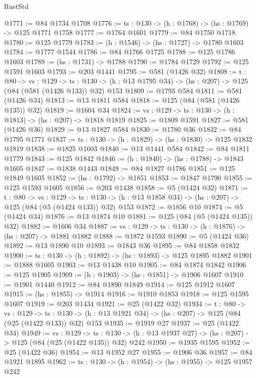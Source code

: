 \begin{lexlean}{RustStd}
\begin{coremodule}
{\begin{coremodule}
{{{{{{{{{{{{{{{@1771 := @84 @1734 @1708
@1776 := {ts : @130} -> (h : @1768) -> (hs : @1769) -> @125 @1771 @1758
@1777 := @1764 @1601
@1779 := @84 @1750 @1718
@1780 := @125 @1779
@1783 := (h : @1546) -> (hs : @1727) -> @1780 @1603
@1784 := @1777 @1544
@1786 := @84 @1766 @1725
@1788 := @125 @1786 @1603
@1789 := (hs : @1731) -> @1788
@1790 := @1784 @1729
@1792 := @125 @1591 @1603
@1793 := @203 @1441
@1795 := @581 (@1426 @32)
@1808 := {t : @80} ->
  {vs : @129} ->
  {ts : @130} -> (h : @13 @1795 @34) -> (hs : @207) -> @125 (@84 (@581 (@1426 @133)) @32) @153
@1809 := @1793 @584
@1811 := @581 (@1426 @34)
@1813 := @13 @1811 @584
@1818 := @125 (@84 (@581 (@1426 @135)) @32)
@1819 := @1604 @34
@1824 := {vs : @129} -> {ts : @130} -> (h : @1813) -> (hs : @207) -> @1818 @1819
@1825 := @1809 @1591
@1827 := @581 (@1426 @36)
@1829 := @13 @1827 @584
@1830 := @1780 @36
@1832 := @84 @1795 @1771
@1837 := {ts : @130} -> (h : @1829) -> (hs : @1830) -> @125 @1832 @1819
@1838 := @1825 @1603
@1840 := @13 @1441 @584
@1842 := @84 @1811 @1779
@1843 := @125 @1842
@1846 := (h : @1840) -> (hs : @1788) -> @1843 @1605
@1847 := @1838 @1443
@1849 := @84 @1827 @1786
@1851 := @125 @1849 @1605
@1852 := (hs : @1792) -> @1851
@1853 := @1847 @1790
@1855 := @125 @1593 @1605
@1856 := @203 @1438
@1858 := @5 (@1424 @32)
@1871 := {t : @80} ->
  {vs : @129} ->
  {ts : @130} -> (h : @13 @1858 @34) -> (hs : @207) -> @125 (@84 (@5 (@1424 @133)) @32) @153
@1872 := @1856 @10
@1874 := @5 (@1424 @34)
@1876 := @13 @1874 @10
@1881 := @125 (@84 (@5 (@1424 @135)) @32)
@1882 := @1606 @34
@1887 := {vs : @129} -> {ts : @130} -> (h : @1876) -> (hs : @207) -> @1881 @1882
@1888 := @1872 @1593
@1890 := @5 (@1424 @36)
@1892 := @13 @1890 @10
@1893 := @1843 @36
@1895 := @84 @1858 @1832
@1900 := {ts : @130} -> (h : @1892) -> (hs : @1893) -> @125 @1895 @1882
@1901 := @1888 @1605
@1903 := @13 @1438 @10
@1905 := @84 @1874 @1842
@1906 := @125 @1905
@1909 := (h : @1903) -> (hs : @1851) -> @1906 @1607
@1910 := @1901 @1440
@1912 := @84 @1890 @1849
@1914 := @125 @1912 @1607
@1915 := (hs : @1855) -> @1914
@1916 := @1910 @1853
@1918 := @125 @1595 @1607
@1919 := @203 @1434
@1921 := @25 (@1422 @32)
@1934 := {t : @80} ->
  {vs : @129} ->
  {ts : @130} -> (h : @13 @1921 @34) -> (hs : @207) -> @125 (@84 (@25 (@1422 @133)) @32) @153
@1935 := @1919 @27
@1937 := @25 (@1422 @34)
@1949 := {vs : @129} ->
  {ts : @130} -> (h : @13 @1937 @27) -> (hs : @207) -> @125 (@84 (@25 (@1422 @135)) @32) @242
@1950 := @1935 @1595
@1952 := @25 (@1422 @36)
@1954 := @13 @1952 @27
@1955 := @1906 @36
@1957 := @84 @1921 @1895
@1962 := {ts : @130} -> (h : @1954) -> (hs : @1955) -> @125 @1957 @242
}}}}}}}}}}}}}}}
\end{coremodule}}
\end{coremodule}
\end{lexlean}
